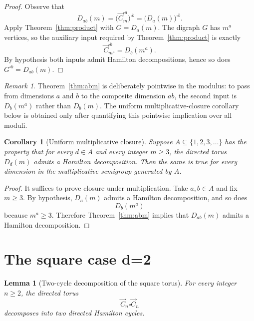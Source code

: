 \documentclass[11pt]{article}
\newtheorem{corollary}[theorem]{Corollary}
\newtheorem{lemma}[theorem]{Lemma}
\theoremstyle{remark}
\newtheorem{remark}[theorem]{Remark}
\newcommand{\torus}[2]{D_{#1}(#2)}
\begin{document}
\begin{proof}
Observe that
\[
\torus{ab}{m}=\bigl(\vec C_m^{\square a}\bigr)^{\square b}=\bigl(\torus{a}{m}\bigr)^{\square b}.
\]
Apply Theorem~\ref{thm:product} with $G=\torus{a}{m}$.
The digraph $G$ has $m^a$ vertices, so the auxiliary input required by Theorem~\ref{thm:product} is exactly
\[
\vec C_{m^a}^{\square b}=\torus{b}{m^a}.
\]
By hypothesis both inputs admit Hamilton decompositions, hence so does $G^{\square b}=\torus{ab}{m}$.
\end{proof}

\begin{remark}
Theorem~\ref{thm:abm} is deliberately pointwise in the modulus: to pass from dimensions $a$ and $b$ to the composite dimension $ab$, the second input is $\torus{b}{m^a}$ rather than $\torus{b}{m}$.
The uniform multiplicative-closure corollary below is obtained only after quantifying this pointwise implication over all moduli.
\end{remark}

\begin{corollary}[Uniform multiplicative closure]\label{cor:multiplicative}
Suppose $A\subseteq \{1,2,3,\dots\}$ has the property that for every $d\in A$ and every integer $m\ge 3$, the directed torus $\torus{d}{m}$ admits a Hamilton decomposition.
Then the same is true for every dimension in the multiplicative semigroup generated by $A$.
\end{corollary}

\begin{proof}
It suffices to prove closure under multiplication.
Take $a,b\in A$ and fix $m\ge 3$.
By hypothesis, $\torus{a}{m}$ admits a Hamilton decomposition, and so does
\[
\torus{b}{m^a}
\]
because $m^a\ge 3$.
Therefore Theorem~\ref{thm:abm} implies that $\torus{ab}{m}$ admits a Hamilton decomposition.
\end{proof}

\section{The square case d=2}

\begin{lemma}[Two-cycle decomposition of the square torus]\label{lem:square}
For every integer $n\ge 2$, the directed torus
\[
\vec C_n\square \vec C_n
\]
decomposes into two directed Hamilton cycles.
\end{lemma}
\end{document}
